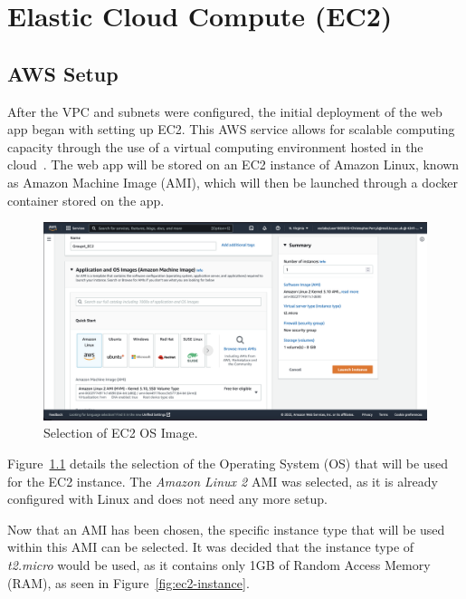 \chapter{Elastic Cloud Compute (EC2)}\label{ch:ec2}

\section{AWS Setup}\label{sec:aws-setup}

After the VPC and subnets were configured, the initial deployment of the web app began with setting up EC2.
This AWS service allows for scalable computing capacity through the use of a virtual computing environment hosted in the
cloud~\parencite{aws2022ec2}.
The web app will be stored on an EC2 instance of Amazon Linux, known as Amazon Machine Image (AMI), which will then be
launched through a docker container stored on the app.

\begin{figure}[!htbp]
    \centering
    \includegraphics[width=\textwidth]{resources/ec2/create-instance-application-and-os-images}
    \caption{Selection of EC2 OS Image.}
    \label{fig:ec2-os}
\end{figure}

Figure~\ref{fig:ec2-os} details the selection of the Operating System (OS) that will be used for the EC2 instance.
The \textit{Amazon Linux 2} AMI was selected, as it is already configured with Linux and does not need any more setup.

Now that an AMI has been chosen, the specific instance type that will be used within this AMI can be selected.
It was decided that the instance type of \textit{t2.micro} would be used, as it contains only 1GB of Random Access
Memory (RAM), as seen in Figure~\ref{fig:ec2-instance}.

